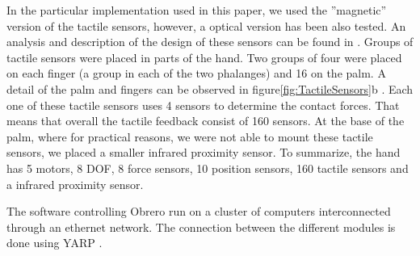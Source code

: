 In the particular implementation used in this paper, we used the
''magnetic'' version of the tactile sensors, however, a optical
version has been also tested. An analysis and description of the
design of these sensors can be found in \cite{etorresjSoft}.
Groups of tactile sensors were placed in parts of the hand. Two
groups of four were placed on each finger (a group in each of the
two phalanges) and 16 on the palm. A detail of the palm and
fingers can be observed in figure\ref{fig:TactileSensors}b . Each
one of these tactile sensors uses 4 sensors to determine the
contact forces. That means that overall the tactile feedback
consist of 160 sensors. At the base of the palm, where for
practical reasons, we were not able to mount these tactile
sensors, we placed a smaller infrared proximity sensor. To
summarize, the hand has 5 motors, 8 DOF, 8 force sensors, 10
position sensors, 160 tactile sensors and a infrared proximity
sensor.

The software controlling Obrero run on a cluster of computers 
interconnected through an ethernet network. The connection between 
the different modules is done using YARP \cite{yarpPaper}.